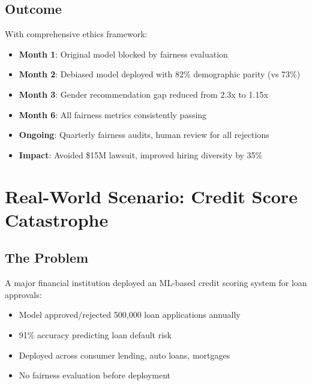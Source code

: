 \subsection{Outcome}

With comprehensive ethics framework:
\begin{itemize}
    \item \textbf{Month 1}: Original model blocked by fairness evaluation
    \item \textbf{Month 2}: Debiased model deployed with 82\% demographic parity (vs 73\%)
    \item \textbf{Month 3}: Gender recommendation gap reduced from 2.3x to 1.15x
    \item \textbf{Month 6}: All fairness metrics consistently passing
    \item \textbf{Ongoing}: Quarterly fairness audits, human review for all rejections
    \item \textbf{Impact}: Avoided \$15M lawsuit, improved hiring diversity by 35\%
\end{itemize}

\section{Real-World Scenario: Credit Score Catastrophe}

\subsection{The Problem}

A major financial institution deployed an ML-based credit scoring system for loan approvals:

\begin{itemize}
    \item Model approved/rejected 500,000 loan applications annually
    \item 91\% accuracy predicting loan default risk
    \item Deployed across consumer lending, auto loans, mortgages
    \item No fairness evaluation before deployment
\end{itemize}

